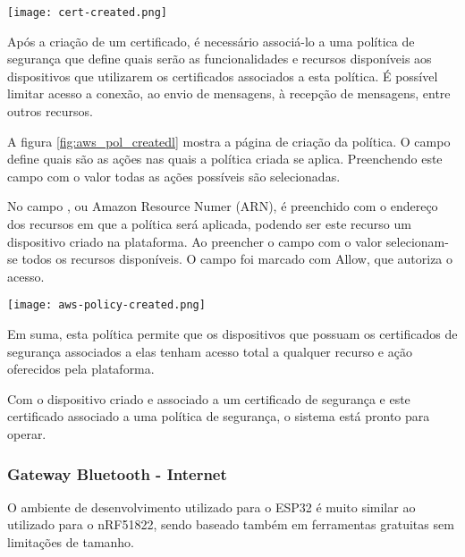 \begin{center}
	\centering 
	\texttt{[image: cert-created.png]}
	\label{fig:aws_cert_dl}
\end{center} 

Após a criação de um certificado, é necessário associá-lo a uma política de
segurança que define quais serão as funcionalidades e recursos disponíveis aos
dispositivos que utilizarem os certificados associados a esta política. É
possível limitar acesso a conexão, ao envio de mensagens, à recepção de
mensagens, entre outros recursos. 

A figura \ref{fig:aws_pol_createdl} mostra a página de criação da
política. O campo  define quais são as ações nas quais a
política criada se aplica. Preenchendo este campo com o valor 
todas as ações possíveis são selecionadas.

 No campo , ou Amazon Resource Numer (ARN), é preenchido
 com o endereço dos recursos em que a política será aplicada, podendo ser este
 recurso um dispositivo criado na plataforma. Ao preencher o campo com o valor
 \dblquote{*} selecionam-se todos os recursos disponíveis. O campo
  foi marcado com Allow, que autoriza o acesso.
  
\begin{center}
	\centering 
	\texttt{[image: aws-policy-created.png]}
	\label{fig:aws_pol_createdl}
\end{center} 

Em suma, esta política permite que os dispositivos que possuam os certificados
de segurança associados a elas tenham acesso total a qualquer recurso e ação
oferecidos pela plataforma.

Com o dispositivo criado e associado a um certificado de segurança e este
certificado associado a uma política de segurança, o sistema está pronto para
operar.

\subsubsection{Gateway Bluetooth - Internet}


O ambiente de desenvolvimento utilizado para o ESP32 é muito similar ao
utilizado para o nRF51822, sendo baseado também em ferramentas gratuitas sem
limitações de tamanho.

